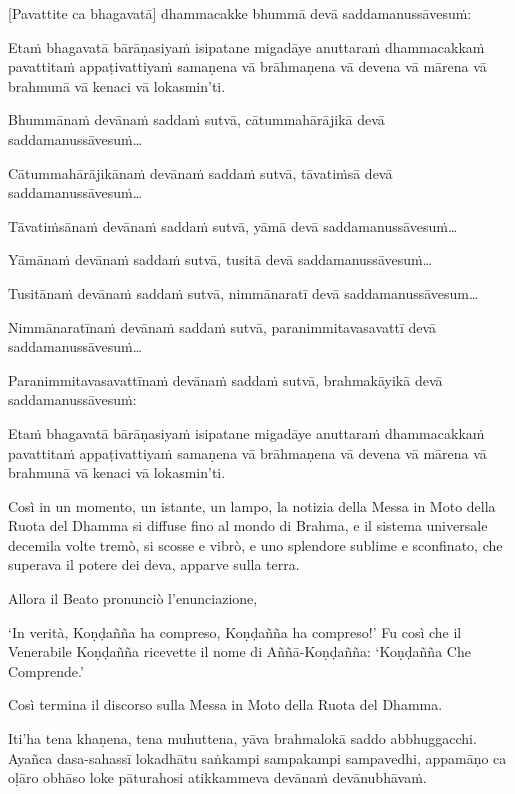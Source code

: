 [Pavattite ca bhagavatā] dhammacakke bhummā devā saddamanussāvesuṁ:

Etaṁ bhagavatā bārāṇasiyaṁ isipatane migadāye anuttaraṁ dhammacakkaṁ
pavattitaṁ appaṭivattiyaṁ samaṇena vā brāhmaṇena vā devena vā mārena vā
brahmunā vā kenaci vā lokasmin'ti.

Bhummānaṁ devānaṁ saddaṁ sutvā, cātummahārājikā devā
saddamanussāvesuṁ\ldots

Cātummahārājikānaṁ devānaṁ saddaṁ sutvā, tāvatiṁsā devā
saddamanussāvesuṁ\ldots

Tāvatiṁsānaṁ devānaṁ saddaṁ sutvā, yāmā devā saddamanussāvesuṁ\ldots

Yāmānaṁ devānaṁ saddaṁ sutvā, tusitā devā saddamanussāvesuṁ\ldots

Tusitānaṁ devānaṁ saddaṁ sutvā, nimmānaratī devā saddamanussāvesum\ldots

Nimmānaratīnaṁ devānaṁ saddaṁ sutvā, paranimmitavasavattī devā
saddamanussāvesuṁ\ldots

Paranimmitavasavattīnaṁ devānaṁ saddaṁ sutvā, brahmakāyikā devā
saddamanussāvesuṁ:

Etaṁ bhagavatā bārāṇasiyaṁ isipatane migadāye anuttaraṁ dhammacakkaṁ
pavattitaṁ appaṭivattiyaṁ samaṇena vā brāhmaṇena vā devena vā mārena vā
brahmunā vā kenaci vā lokasmin'ti.

\clearpage

\englishText
\markboth{\englishTitle}{\rightmark}

Così in un momento, un istante, un lampo, la notizia della Messa in Moto della
Ruota del Dhamma si diffuse fino al mondo di Brahma, e il
sistema universale decemila volte tremò, si scosse e vibrò, e uno
splendore sublime e sconfinato, che superava il potere dei deva, apparve sulla
terra.

Allora il Beato pronunciò l'enunciazione,

‘In verità, Koṇḍañña ha compreso, Koṇḍañña ha compreso!’ Fu così
che il Venerabile Koṇḍañña ricevette il nome di Aññā-Koṇḍañña: ‘Koṇḍañña Che
Comprende.’

Così termina il discorso sulla Messa in Moto della Ruota del Dhamma.

\clearpage

\paliText
\markboth{\paliTitle}{\rightmark}

Iti'ha tena khaṇena, tena muhuttena, yāva brahmalokā saddo abbhuggacchi.
Ayañca dasa-sahassī lokadhātu saṅkampi sampakampi sampavedhi, appamāṇo ca
oḷāro obhāso loke pāturahosi atikkammeva devānaṁ devānubhāvaṁ.

